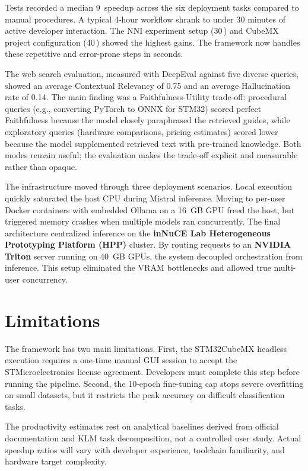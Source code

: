 Tests recorded a median 9\,\texttimes{} speedup across the six deployment tasks compared to manual procedures. A typical 4-hour workflow shrank to under 30 minutes of active developer interaction. The NNI experiment setup (30\,\texttimes{}) and CubeMX project configuration (40\,\texttimes{}) showed the highest gains. The framework now handles these repetitive and error-prone steps in seconds.

The web search evaluation, measured with DeepEval against five diverse queries, showed an average Contextual Relevancy of 0.75 and an average Hallucination rate of 0.14. The main finding was a Faithfulness-Utility trade-off: procedural queries (e.g., converting PyTorch to ONNX for STM32) scored perfect Faithfulness because the model closely paraphrased the retrieved guides, while exploratory queries (hardware comparisons, pricing estimates) scored lower because the model supplemented retrieved text with pre-trained knowledge. Both modes remain useful; the evaluation makes the trade-off explicit and measurable rather than opaque.

The infrastructure moved through three deployment scenarios. Local execution quickly saturated the host CPU during Mistral inference. Moving to per-user Docker containers with embedded Ollama on a 16~GB GPU freed the host, but triggered memory crashes when multiple models ran concurrently. The final architecture centralized inference on the \textbf{inNuCE Lab Heterogeneous Prototyping Platform (HPP)} cluster. By routing requests to an \textbf{NVIDIA Triton} server running on 40~GB GPUs, the system decoupled orchestration from inference. This setup eliminated the VRAM bottlenecks and allowed true multi-user concurrency.

\section{Limitations}

The framework has two main limitations. First, the STM32CubeMX headless execution requires a one-time manual GUI session to accept the STMicroelectronics license agreement. Developers must complete this step before running the pipeline. Second, the 10-epoch fine-tuning cap stops severe overfitting on small datasets, but it restricts the peak accuracy on difficult classification tasks.

The productivity estimates rest on analytical baselines derived from official documentation and KLM task decomposition, not a controlled user study. Actual speedup ratios will vary with developer experience, toolchain familiarity, and hardware target complexity.

